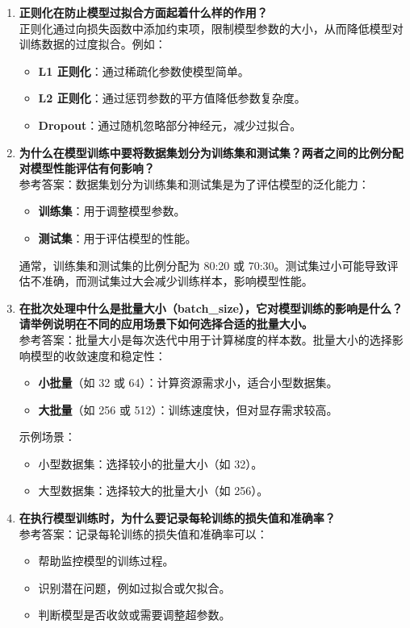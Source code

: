 \begin{enumerate}
    \item \textbf{正则化在防止模型过拟合方面起着什么样的作用？}\\
    正则化通过向损失函数中添加约束项，限制模型参数的大小，从而降低模型对训练数据的过度拟合。例如：
    \begin{itemize}
        \item \textbf{L1 正则化}：通过稀疏化参数使模型简单。
        \item \textbf{L2 正则化}：通过惩罚参数的平方值降低参数复杂度。
        \item \textbf{Dropout}：通过随机忽略部分神经元，减少过拟合。
    \end{itemize}

    \item \textbf{为什么在模型训练中要将数据集划分为训练集和测试集？两者之间的比例分配对模型性能评估有何影响？}\\
    参考答案：数据集划分为训练集和测试集是为了评估模型的泛化能力：
    \begin{itemize}
        \item \textbf{训练集}：用于调整模型参数。
        \item \textbf{测试集}：用于评估模型的性能。
    \end{itemize}
    通常，训练集和测试集的比例分配为 80:20 或 70:30。测试集过小可能导致评估不准确，而测试集过大会减少训练样本，影响模型性能。

    \item \textbf{在批次处理中什么是批量大小（batch\_size），它对模型训练的影响是什么？请举例说明在不同的应用场景下如何选择合适的批量大小。}\\
    参考答案：批量大小是每次迭代中用于计算梯度的样本数。批量大小的选择影响模型的收敛速度和稳定性：
    \begin{itemize}
        \item \textbf{小批量}（如 32 或 64）：计算资源需求小，适合小型数据集。
        \item \textbf{大批量}（如 256 或 512）：训练速度快，但对显存需求较高。
    \end{itemize}
    示例场景：
    \begin{itemize}
        \item 小型数据集：选择较小的批量大小（如 32）。
        \item 大型数据集：选择较大的批量大小（如 256）。
    \end{itemize}

    \item \textbf{在执行模型训练时，为什么要记录每轮训练的损失值和准确率？}\\
    参考答案：记录每轮训练的损失值和准确率可以：
    \begin{itemize}
        \item 帮助监控模型的训练过程。
        \item 识别潜在问题，例如过拟合或欠拟合。
        \item 判断模型是否收敛或需要调整超参数。
    \end{itemize}


\end{enumerate}
